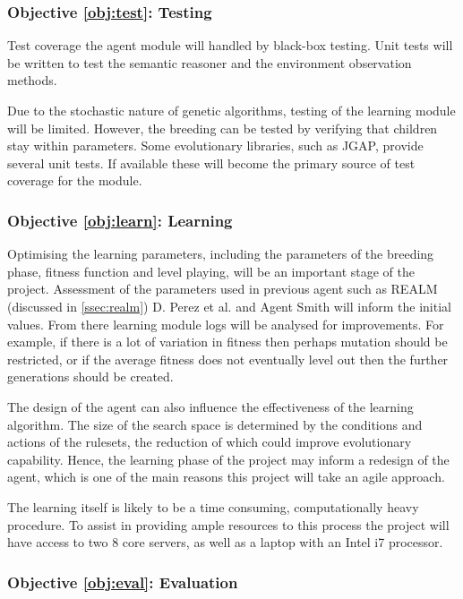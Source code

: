 \subsubsection*{Objective \ref{obj:test}: Testing}
\label{meth:test}

Test coverage the agent module will handled by black-box testing. Unit tests will be written to test the semantic reasoner and the environment observation methods.

Due to the stochastic nature of genetic algorithms, testing of the learning module will be limited. However, the breeding can be tested by verifying that children stay within parameters. Some evolutionary libraries, such as JGAP, provide several unit tests. If available these will become the primary source of test coverage for the module.

\subsubsection*{Objective \ref{obj:learn}: Learning}
\label{meth:learn}

Optimising the learning parameters, including the parameters of the breeding phase, fitness function and level playing, will be an important stage of the project. Assessment of the parameters used in previous agent such as REALM (discussed in \ref{ssec:realm}) D. Perez et al. \cite{gramev} and Agent Smith \cite{agentsmith} will inform the initial values. From there learning module logs will be analysed for improvements. For example, if there is a lot of variation in fitness then perhaps mutation should be restricted, or if the average fitness does not eventually level out then the further generations should be created.

The design of the agent can also influence the effectiveness of the learning algorithm. The size of the search space is determined by the conditions and actions of the rulesets, the reduction of which could improve evolutionary capability. Hence, the learning phase of the project may inform a redesign of the agent, which is one of the main reasons this project will take an agile approach.

The learning itself is likely to be a time consuming, computationally heavy procedure. To assist in providing ample resources to this process the project will have access to two 8 core servers, as well as a laptop with an Intel i7 processor.

\subsubsection*{Objective \ref{obj:eval}: Evaluation}
\label{meth:eval}

